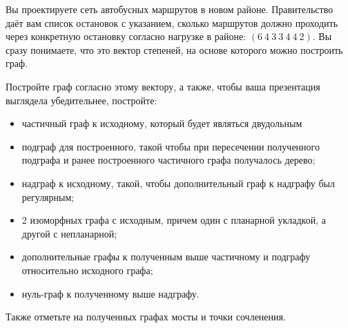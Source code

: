 \question
Вы проектируете сеть автобусных маршрутов в новом районе. Правительство даёт вам список остановок с указанием, сколько маршрутов должно проходить через конкретную остановку согласно нагрузке в районе: $(6\ 4\ 3\ 3\ 4\ 4\ 2)$. Вы сразу понимаете, что это вектор степеней, на основе которого можно построить граф.

Постройте граф согласно этому вектору, а также, чтобы ваша презентация выглядела убедительнее, постройте:

\begin{itemize}
\item частичный граф к исходному, который будет являться двудольным
\item подграф для построенного, такой чтобы при пересечении полученного подграфа и ранее построенного частичного графа получалось дерево;
\item надграф к исходному, такой, чтобы дополнительный граф к надграфу был регулярным;
\item 2 изоморфных графа с исходным, причем один с планарной укладкой, а другой с непланарной;
\item дополнительные графы к полученным выше частичному и подграфу относительно исходного графа;
\item нуль-граф к полученному выше надграфу.
\end{itemize}

Также отметьте на полученных графах мосты и точки сочленения.
